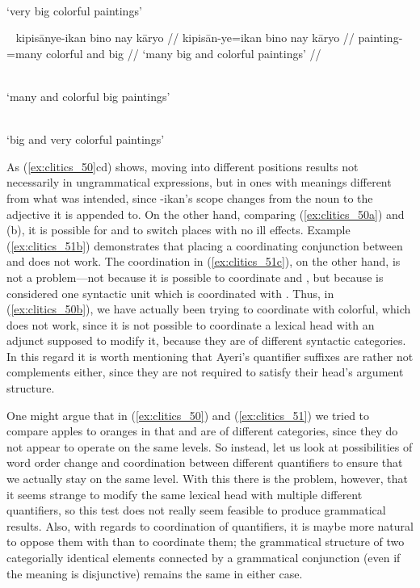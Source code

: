 \a\label{ex:clitics_50d} \ljudge{\excl}  \\
	`very big colorful paintings'
\xe

\pex~\label{ex:clitics_51}
\a\label{ex:clitics_51a}\begingl
	\gla kipisānye-ikan bino nay kāryo //
	\glb kipisān-ye=ikan bino nay kāryo //
	\glc painting-\Pl{}=many colorful and big //
	\glft `many big and colorful paintings' //
\endgl

\a\label{ex:clitics_51b} \ljudge{*}  \\
	`many and colorful big paintings'

\a\label{ex:clitics_51c} \ljudge{\excl}  \\
	`big and very colorful paintings'
\xe

As (\ref{ex:clitics_50}cd) shows, moving 
into different positions results not necessarily in ungrammatical expressions,
but in ones with meanings different from what was intended, since 
{-ikan}'s scope changes from the noun to the adjective it is appended to. On
the other hand, comparing (\ref{ex:clitics_50a}) and (b), it is possible for
 and  to switch places with
no ill effects. Example (\ref{ex:clitics_51b}) demonstrates that placing a
coordinating conjunction between  and  does
not work. The coordination in (\ref{ex:clitics_51c}), on the other hand, is not
a problem---not because it is possible to coordinate  and
, but because  is
considered one syntactic unit which is coordinated with
. Thus, in (\ref{ex:clitics_50b}), we have actually been
trying to coordinate 
with  {colorful}, which does not work, since it is not
possible to coordinate a lexical head with an adjunct supposed to modify it,
because they are of different syntactic categories. In this regard it is worth
mentioning that Ayeri's quantifier suffixes are rather not complements either,
since they are not required to satisfy their head's argument structure.

One might argue that in (\ref{ex:clitics_50}) and (\ref{ex:clitics_51}) we
tried to compare apples to oranges in that  and  are of different categories, since they
do not appear to operate on the same levels. So instead, let us look at
possibilities of word order change and coordination between different
quantifiers to ensure that we actually stay on the same level. With this there
is the problem, however, that it seems strange to modify the same lexical head
with multiple different quantifiers, so this test does not really seem feasible
to produce grammatical results. Also, with regards to coordination of
quantifiers, it is maybe more natural to oppose them with
 than to coordinate them; the grammatical structure of
two categorially identical elements connected by a grammatical conjunction
(even if the meaning is disjunctive) remains the same in either case.

